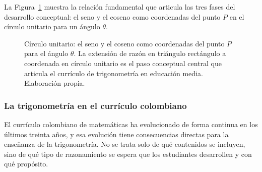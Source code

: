 La Figura~\ref{fig:circulo_unitario} muestra la relación fundamental que articula las tres fases del desarrollo conceptual: el seno y el coseno como coordenadas del punto $P$ en el círculo unitario para un ángulo $\theta$.

\begin{figure}[H]
\centering
{}
\caption{Círculo unitario: el seno y el coseno como coordenadas del punto $P$ para el ángulo $\theta$.
La extensión de razón en triángulo rectángulo a coordenada en círculo unitario es el paso conceptual
central que articula el currículo de trigonometría en educación media. Elaboración propia.}
\label{fig:circulo_unitario}
\end{figure}

\subsubsection{La trigonometría en el currículo colombiano}

El currículo colombiano de matemáticas ha evolucionado de forma continua en los últimos treinta años, y esa evolución tiene consecuencias directas para la enseñanza de la trigonometría. No se trata solo de qué contenidos se incluyen, sino de qué tipo de razonamiento se espera que los estudiantes desarrollen y con qué propósito.


